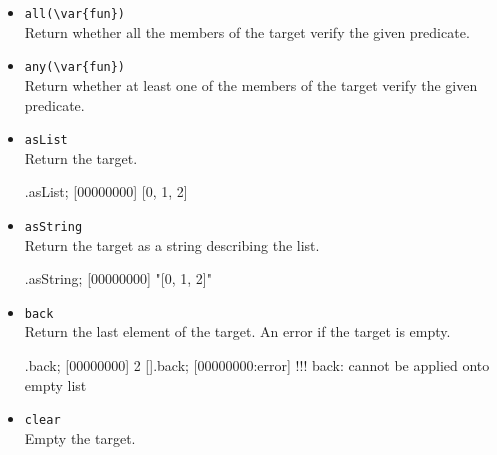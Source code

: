 \begin{itemize}
\item \lstinline|all(\var{fun})|\\
Return whether all the members of the target verify the given
predicate.


\item \lstinline|any(\var{fun})|\\
Return whether at least one of the members of the target verify the
given predicate.


\item \lstinline|asList|\\
Return the target.

\begin{urbiscript}[firstnumber=last]
[0, 1, 2].asList;
[00000000] [0, 1, 2]
\end{urbiscript}

\item \lstinline|asString|\\
Return the target as a string describing the list.

\begin{urbiscript}[firstnumber=last]
[0, 1, 2].asString;
[00000000] "[0, 1, 2]"
\end{urbiscript}

\item \lstinline|back|\\
Return the last element of the target. An error if the target is empty.

\begin{urbiscript}[firstnumber=last]
[0, 1, 2].back;
[00000000] 2
[].back;
[00000000:error] !!! back: cannot be applied onto empty list
\end{urbiscript}

\item \lstinline|clear|\\
Empty the target.


\end{itemize}
